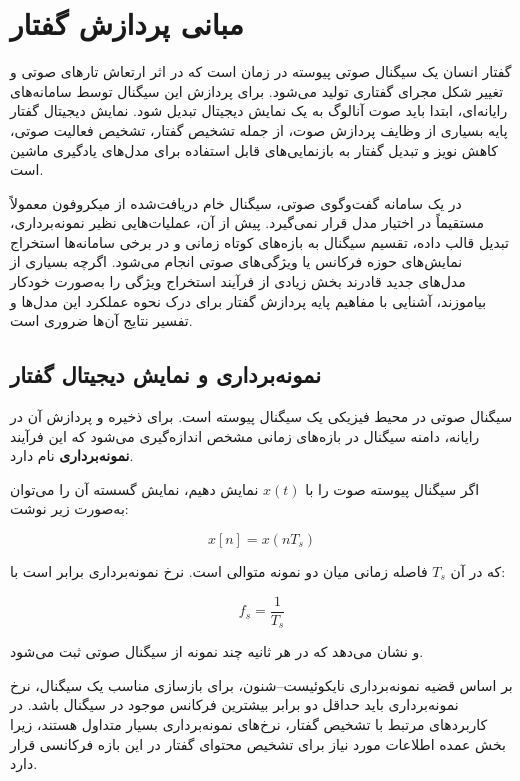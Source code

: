 \section{مبانی پردازش گفتار}

گفتار انسان یک سیگنال صوتی پیوسته در زمان است که در اثر ارتعاش
تارهای صوتی و تغییر شکل مجرای گفتاری تولید می‌شود.
برای پردازش این سیگنال توسط سامانه‌های رایانه‌ای، ابتدا باید صوت
آنالوگ به یک نمایش دیجیتال تبدیل شود.
نمایش دیجیتال گفتار پایه بسیاری از وظایف پردازش صوت، از جمله
تشخیص گفتار، تشخیص فعالیت صوتی، کاهش نویز و تبدیل گفتار به
بازنمایی‌های قابل استفاده برای مدل‌های یادگیری ماشین است.

در یک سامانه گفت‌وگوی صوتی، سیگنال خام دریافت‌شده از میکروفون
معمولاً مستقیماً در اختیار مدل قرار نمی‌گیرد.
پیش از آن، عملیات‌هایی نظیر نمونه‌برداری، تبدیل قالب داده،
تقسیم سیگنال به بازه‌های کوتاه زمانی و در برخی سامانه‌ها
استخراج نمایش‌های حوزه فرکانس یا ویژگی‌های صوتی انجام می‌شود.
اگرچه بسیاری از مدل‌های جدید قادرند بخش زیادی از فرآیند استخراج
ویژگی را به‌صورت خودکار بیاموزند، آشنایی با مفاهیم پایه پردازش
گفتار برای درک نحوه عملکرد این مدل‌ها و تفسیر نتایج آن‌ها ضروری است.


\subsection{نمونه‌برداری و نمایش دیجیتال گفتار}

سیگنال صوتی در محیط فیزیکی یک سیگنال پیوسته است.
برای ذخیره و پردازش آن در رایانه، دامنه سیگنال در بازه‌های زمانی
مشخص اندازه‌گیری می‌شود که این فرآیند
\textbf{نمونه‌برداری}
نام دارد.

اگر سیگنال پیوسته صوت را با $x(t)$ نمایش دهیم، نمایش گسسته آن
را می‌توان به‌صورت زیر نوشت:

\begin{equation}
x[n] = x(nT_s)
\end{equation}

که در آن $T_s$ فاصله زمانی میان دو نمونه متوالی است.
نرخ نمونه‌برداری
برابر است با:

\begin{equation}
f_s = \frac{1}{T_s}
\end{equation}

و نشان می‌دهد که در هر ثانیه چند نمونه از سیگنال صوتی ثبت
می‌شود.

بر اساس قضیه نمونه‌برداری نایکوئیست--شنون، برای بازسازی مناسب
یک سیگنال، نرخ نمونه‌برداری باید حداقل دو برابر بیشترین فرکانس
موجود در سیگنال باشد.
در کاربردهای مرتبط با تشخیص گفتار، نرخ‌های نمونه‌برداری
 بسیار متداول هستند، زیرا بخش عمده اطلاعات مورد نیاز
برای تشخیص محتوای گفتار در این بازه فرکانسی قرار دارد.


